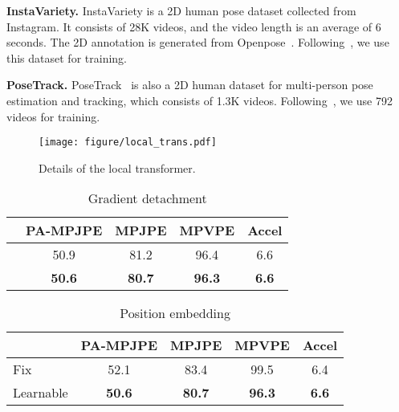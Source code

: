 \documentclass[10pt,twocolumn,letterpaper]{article}
\begin{document}
	\noindent\textbf{InstaVariety.}
	InstaVariety is a 2D human pose dataset collected from Instagram. It consists of 28K videos, and the video length is an average of 6 seconds. The 2D annotation is generated from Openpose~\cite{ZheCao2018OpenPoseRM}. Following~\cite{TCMR, MPII3D}, we use this dataset for training.
	
	
	\noindent\textbf{PoseTrack.}
    PoseTrack~\cite{PoseTrack} is also a 2D human dataset for multi-person pose estimation and tracking, which consists of 1.3K videos. Following~\cite{TCMR}, we use 792 videos for training. 
    
    \begin{figure}[!t]
		\texttt{[image: figure/local\_trans.pdf]}
\caption{Details of the local transformer.}
\label{fig:local_transformer}
	\end{figure}
	
	\begin{table}[!t]
		\small
		\setlength{\tabcolsep}{5. pt}
		\begin{center}
			\begin{tabular}{l | c | c | c | c}
\toprule[2pt]
				\normalsize
				 & PA-MPJPE & MPJPE & MPVPE & Accel \\
				\midrule[1pt]
				  & 50.9 & 81.2 & 96.4 & 6.6 \\
				\cellcolor{Gray} & \cellcolor{Gray}\textbf{50.6} & \cellcolor{Gray}\textbf{80.7} & \cellcolor{Gray}\textbf{96.3} & \cellcolor{Gray}\textbf{6.6} \\
				\bottomrule[1pt]
\end{tabular}
		\end{center}
		\vspace*{-1.8 em}
		\caption{Gradient detachment}
		\vspace*{-.5 em}
		\label{tab:gradient}
	\end{table}

	\begin{table}[!t]
		\vspace*{-.5 em}
		\small
		\setlength{\tabcolsep}{6. pt}
		\begin{center}
			\begin{tabular}{l | c | c | c | c}
\toprule[2pt]
				\normalsize
				 & PA-MPJPE & MPJPE & MPVPE & Accel \\
				\midrule[1pt]
				Fix & 52.1 & 83.4 & 99.5 & 6.4 \\
				\cellcolor{Gray}Learnable& \cellcolor{Gray}\textbf{50.6} & \cellcolor{Gray}\textbf{80.7} & \cellcolor{Gray}\textbf{96.3} & \cellcolor{Gray}\textbf{6.6} \\
				\bottomrule[1pt]
\end{tabular}
		\end{center}
		\vspace*{-1.8 em}
		\caption{Position embedding}
		\vspace*{-2.2em}
		\label{tab:position}
	\end{table}
\end{document}
